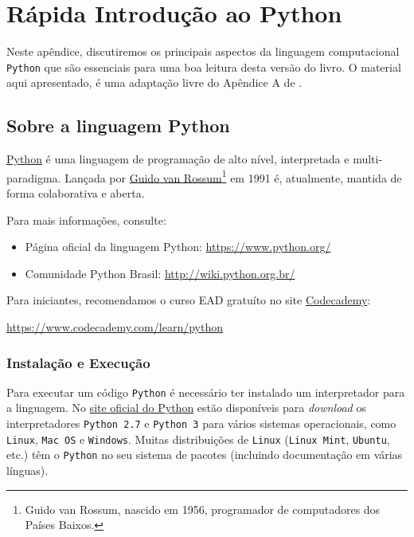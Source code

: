 
\chapter{Rápida Introdução ao Python}\label{cap:python}

Neste apêndice, discutiremos os principais aspectos da linguagem computacional \verb+Python+ que são essenciais para uma boa leitura desta versão do livro. O material aqui apresentado, é uma adaptação livre do Apêndice A de \cite{CALSCI}.

\section{Sobre a linguagem Python}

\href{https://www.python.org/}{Python} é uma linguagem de programação de alto nível, interpretada e multi-paradigma. Lançada por \href{https://gvanrossum.github.io//}{Guido van Rossum}\footnote{Guido van Rossum, nascido em 1956, programador de computadores dos Países Baixos.} em 1991 é, atualmente, mantida de forma colaborativa e aberta.

Para mais informações, consulte:
\begin{itemize}
\item Página oficial da linguagem Python: \url{https://www.python.org/}
\item Comunidade Python Brasil: \url{http://wiki.python.org.br/}
\end{itemize}

Para iniciantes, recomendamos o curso EAD gratuíto no site \href{https://www.codecademy.com/}{Codecademy}:
\begin{center}
  \url{https://www.codecademy.com/learn/python}
\end{center}

\subsection{Instalação e Execução}

Para executar um código \verb+Python+ é necessário ter instalado um interpretador para a linguagem. No \href{https://www.python.org/}{site oficial do Python} estão disponíveis para {\it download} os interpretadores \verb+Python 2.7+ e \verb+Python 3+ para vários sistemas operacionais, como \verb+Linux+, \verb+Mac OS+ e \verb+Windows+. Muitas distribuições de \verb+Linux+ (\verb+Linux Mint+, \verb+Ubuntu+, etc.) têm o \verb+Python+ no seu sistema de pacotes (incluindo documentação em várias línguas).

